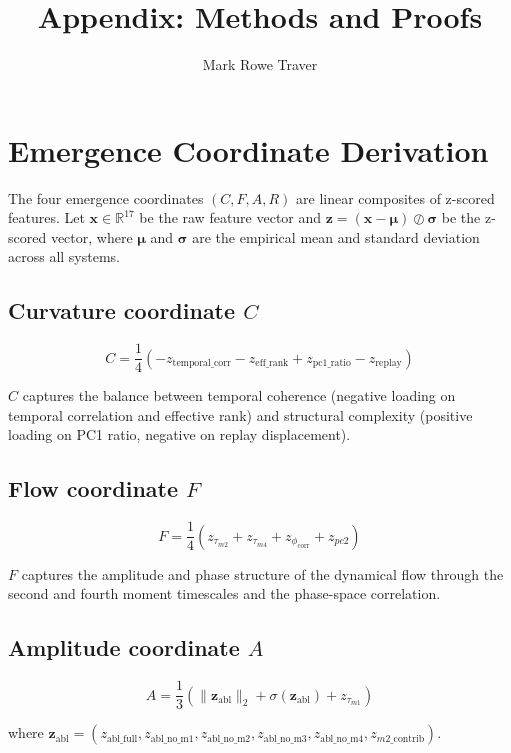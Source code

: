\documentclass[10pt]{article}
\title{Appendix: Methods and Proofs}
\author{Mark Rowe Traver}
\begin{document}
\maketitle

\section{Emergence Coordinate Derivation}
\label{sec:appendix_coords}

The four emergence coordinates $(C, F, A, R)$ are linear composites of z-scored features. Let $\mathbf{x} \in \mathbb{R}^{17}$ be the raw feature vector and $\mathbf{z} = (\mathbf{x} - \boldsymbol{\mu}) \oslash \boldsymbol{\sigma}$ be the z-scored vector, where $\boldsymbol{\mu}$ and $\boldsymbol{\sigma}$ are the empirical mean and standard deviation across all systems.

\subsection{Curvature coordinate $C$}

\[
C = \frac{1}{4} \left( -z_{\text{temporal\_corr}} - z_{\text{eff\_rank}} + z_{\text{pc1\_ratio}} - z_{\text{replay}} \right)
\]

$C$ captures the balance between temporal coherence (negative loading on temporal correlation and effective rank) and structural complexity (positive loading on PC1 ratio, negative on replay displacement).

\subsection{Flow coordinate $F$}

\[
F = \frac{1}{4} \left( z_{\tau_{m2}} + z_{\tau_{m4}} + z_{\phi_{\text{corr}}} + z_{pc2} \right)
\]

$F$ captures the amplitude and phase structure of the dynamical flow through the second and fourth moment timescales and the phase-space correlation.

\subsection{Amplitude coordinate $A$}

\[
A = \frac{1}{3} \left( \|\mathbf{z}_{\text{abl}}\|_2 + \sigma(\mathbf{z}_{\text{abl}}) + z_{\tau_{m1}} \right)
\]

where $\mathbf{z}_{\text{abl}} = (z_{\text{abl\_full}}, z_{\text{abl\_no\_m1}}, z_{\text{abl\_no\_m2}}, z_{\text{abl\_no\_m3}}, z_{\text{abl\_no\_m4}}, z_{m2\_\text{contrib}})$.
\end{document}
